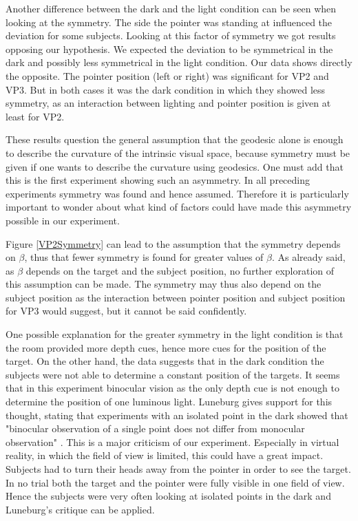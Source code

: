 Another difference between the dark and the light condition can be seen when looking at the symmetry. The side  the pointer was standing at influenced the deviation for some subjects. Looking at this factor of symmetry we got results opposing our hypothesis. We expected the deviation to be symmetrical in the dark and possibly less symmetrical in the light condition. Our data shows directly the opposite. The pointer position (left or right) was significant for VP2 and VP3. But in both cases it was the dark condition in which they showed less symmetry, as an interaction between lighting and pointer position is given at least for VP2.

These results question the general assumption that the geodesic alone is enough to describe the curvature of the intrinsic visual space, because symmetry must be given if one wants to describe the curvature using geodesics. One must add that this is the first experiment showing such an asymmetry. In all preceding experiments symmetry was found and hence assumed. Therefore it is particularly important to wonder about what kind of factors could have made this asymmetry possible in our experiment.

Figure \ref{VP2Symmetry} can lead to the assumption that the symmetry depends on $\beta$, thus that fewer symmetry is found for greater values of $\beta$. As already said, as $\beta$ depends on the target and the subject position, no further exploration of this assumption can be made. The symmetry may thus also depend on the subject position as the interaction between pointer position and subject position for VP3 would suggest, but it cannot be said confidently. 

One possible explanation for the greater symmetry in the light condition is that the room provided more depth cues, hence more cues for the position of the target. On the other hand, the data suggests that in the dark condition the subjects were not able to determine a constant position of the targets. It seems that in this experiment binocular vision as the only depth cue is not enough to determine the position of one luminous light. Luneburg gives support for this thought, stating that experiments with an isolated point in the dark showed that "binocular observation of a single point does not differ from monocular observation" \cite[p.~629]{Luneburg.1950}. This is a major criticism of our experiment. Especially in virtual reality, in which the field of view is limited, this could have a great impact. Subjects had to turn their heads away from the pointer in order to see the target. In no trial both the target and the pointer were fully visible in one field of view. Hence the subjects were very often looking at isolated points in the dark and Luneburg's critique can be applied. 


